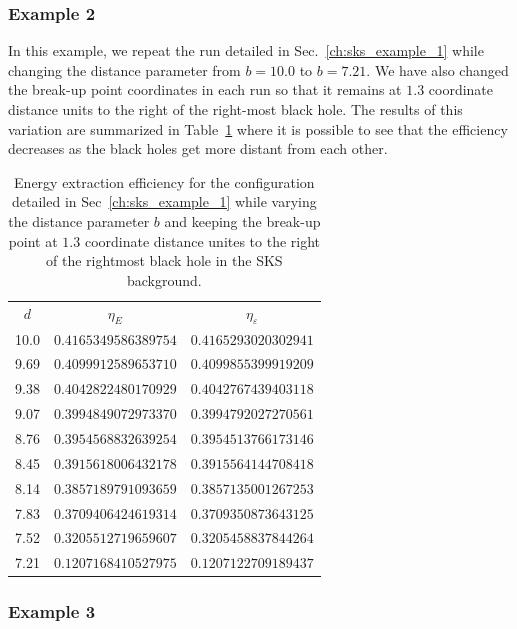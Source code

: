 \subsubsection{Example 2}
\label{ch:sks_example_2}

In this example, we repeat the run detailed in Sec.~\ref{ch:sks_example_1} while changing the distance parameter from $b=10.0$ to $b = 7.21$. We have also changed the break-up point coordinates in each run so that it remains at $1.3$ coordinate distance units to the right of the right-most black hole. The results of this variation are summarized in Table~\ref{tab:arbitrary_penrose_sks_example_results_d_variation} where it is possible to see that the efficiency decreases as the black holes get more distant from each other.

\begin{table}[]
  \centering
  \begin{tabular}{ccc}
    \hline\hline
    $d$  & $\eta_E$             & $\eta_\varepsilon$   \\
    10.0 & $0.4165349586389754$ & $0.4165293020302941$ \\
    9.69 & $0.4099912589653710$ & $0.4099855399919209$ \\
    9.38 & $0.4042822480170929$ & $0.4042767439403118$ \\
    9.07 & $0.3994849072973370$ & $0.3994792027270561$ \\
    8.76 & $0.3954568832639254$ & $0.3954513766173146$ \\
    8.45 & $0.3915618006432178$ & $0.3915564144708418$ \\
    8.14 & $0.3857189791093659$ & $0.3857135001267253$ \\
    7.83 & $0.3709406424619314$ & $0.3709350873643125$ \\
    7.52 & $0.3205512719659607$ & $0.3205458837844264$ \\
    7.21 & $0.1207168410527975$ & $0.1207122709189437$ \\ \hline\hline
  \end{tabular}
  \caption{Energy extraction efficiency for the configuration detailed in Sec~\ref{ch:sks_example_1} while varying the distance parameter $b$ and keeping the break-up point at $1.3$ coordinate distance unites to the right of the rightmost black hole in the \ac{SKS} background.}
  \label{tab:arbitrary_penrose_sks_example_results_d_variation}
\end{table}

\subsubsection{Example 3}
\label{ch:sks_example_3}

